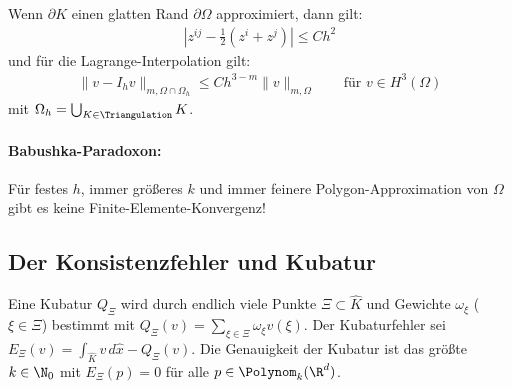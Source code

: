 \begin{Bemerkung}
    Wenn $\partial K$ einen glatten Rand $\partial\Omega$ approximiert, dann
    gilt:
    \begin{eqnarray*}
        \left|z^{ij} - \frac{1}{2} (z^i + z^j)\right| \le C h^2
    \end{eqnarray*}
    und für die Lagrange-Interpolation gilt:
    \begin{eqnarray*}
            \|v - I_h v\|_{m, \Omega \cap \Omega_h}
        \le C h^{3 - m} \|v\|_{m, \Omega}
        \qquad \text{für } v\in H^3(\Omega)
    \end{eqnarray*}
    mit $\Omega_h = \bigcup_{K\in\Triangulation} K$.
\end{Bemerkung}


\paragraph{Babushka-Paradoxon:}



Für festes $h$, immer grö\ss{}eres $k$ und immer feinere
Polygon-Approximation von $\Omega$ gibt es keine Finite-Elemente-Konvergenz!



\subsection{Der Konsistenzfehler und Kubatur}



\begin{Definition}
    \label{def:4.9}
    Eine Kubatur $Q_\varXi$ wird durch endlich viele Punkte $\varXi \subset \hat
    K$ und Gewichte $\omega_\xi$ ($\xi\in \varXi$) bestimmt mit
    $Q_\varXi(v) = \sum_{\xi\in \varXi} \omega_\xi v(\xi)$.
    Der Kubaturfehler sei $E_\varXi(v) = \int_{\hat K} v \,d\hat x -
    Q_\varXi(v)$. Die Genauigkeit der Kubatur ist das grö\ss{}te $k\in\N_0$ mit
    $E_\varXi(p) = 0$ für alle $p\in \Polynom_k(\R^d)$.
\end{Definition}


